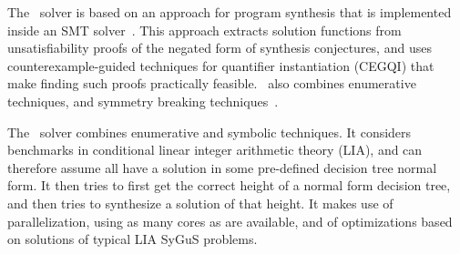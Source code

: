 \begin{table}[b]
	\small
	\begin{center}
	\end{center}
	\caption{List of registered solvers}
	\label{tbl:solvers-authors}
\end{table}


The \cvcnew\ solver is based on an approach for program synthesis that is implemented inside an SMT solver~\cite{ReynoldsDKTB15}.
This approach extracts solution functions from unsatisfiability proofs of the negated form of synthesis conjectures,
and uses counterexample-guided techniques for quantifier instantiation (CEGQI) that make finding such proofs practically feasible.
\cvcnew\ also combines enumerative techniques, and symmetry breaking techniques~\cite{ReynoldsT17}. 

The \dryd\ solver combines enumerative and symbolic techniques.
It considers benchmarks in conditional linear integer arithmetic theory (LIA), and can therefore assume all have a solution in some pre-defined decision tree normal form.
It then tries to first get the correct height of a normal form decision tree, and then tries to synthesize a solution of that height.
It makes use of parallelization, using as many cores as are available, and of optimizations based on solutions of typical LIA SyGuS problems.

